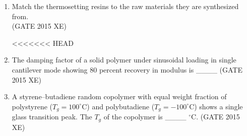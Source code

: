 \documentclass[journal,12pt,onecolumn]{IEEEtran}
\begin{document}
\begin{enumerate}
\begin{enumerate}
\begin{enumerate}
\begin{multicols}{2}
<<<<<<< HEAD
\end{multicols}

\item Match the thermosetting resins to the raw materials they are synthesized from.\\



\hfill{(GATE 2015 XE)} 
\begin{multicols}{2}

<<<<<<< HEAD
\end{multicols}


\item The damping factor of a solid polymer under sinusoidal loading in single cantilever mode showing 80 percent recovery in modulus is \_\_\_\_
\hfill{(GATE 2015 XE)} \\


\item A styrene–butadiene random copolymer with equal weight fraction of polystyrene ($T_g=100^\circ$C) and polybutadiene ($T_g=-100^\circ$C) shows a single glass transition peak. The $T_g$ of the copolymer is \_\_\_\_ $^\circ$C.
\hfill{(GATE 2015 XE)} \\


\end{enumerate}
\end{enumerate}
\end{enumerate}
\end{document}
